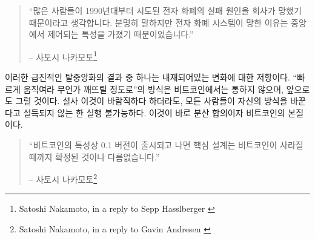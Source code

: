 \begin{quotation}\begin{samepage}
	\begin{comment}
		\enquote{A lot of people automatically dismiss e-currency as a lost cause
			because of all the companies that failed since the 1990's. I hope it's
			obvious it was only the centrally controlled nature of those systems
			that doomed them.}
		\begin{flushright} -- Satoshi Nakamoto\footnote{Satoshi Nakamoto, in a reply to Sepp Hasslberger \cite{satoshi-centralized-nature}}
		\end{comment}
		\enquote{많은 사람들이 1990년대부터 시도된 전자 화폐의 실패 원인을 회사가 망했기 때문이라고 생각합니다.
			분명히 말하지만 전자 화폐 시스템이 망한 이유는 중앙에서 제어되는 특성을 가졌기 때문이었습니다.}
		\begin{flushright} -- 사토시 나카모토\footnote{Satoshi Nakamoto, in a reply to Sepp Hasslberger \cite{satoshi-centralized-nature}}
\end{flushright}\end{samepage}\end{quotation}
	
\begin{comment}
	One consequence of this radical decentralization is an inherent
	resistance to change. \enquote{Move fast and break things} does not and will
	never work on the Bitcoin base layer. Even if it would be desirable, it
	wouldn't be possible without convincing \textit{everyone} to change their ways.
	That's distributed consensus. That's the nature of Bitcoin.
\end{comment}
이러한 급진적인 탈중앙화의 결과 중 하나는 내재되어있는 변화에 대한 저항이다.
\enquote{빠르게 움직여라 무언가 깨뜨릴 정도로}의 방식은 비트코인에서는 통하지 않으며, 앞으로도 그럴 것이다.
설사 이것이 바람직하다 하더라도, 모든 사람들이 자신의 방식을 바꾼다고 설득되지 않는 한 실행 불가능하다.
이것이 바로 분산 합의이자 비트코인의 본질이다.

\begin{quotation}\begin{samepage}
	\begin{comment}
		\enquote{The nature of Bitcoin is such that once version 0.1 was released, the
			core design was set in stone for the rest of its lifetime.}
		\begin{flushright} -- Satoshi Nakamoto\footnote{Satoshi Nakamoto, in a reply to Gavin Andresen \cite{satoshi-centralized-nature}}
		\end{comment}
		\enquote{비트코인의 특성상 0.1 버전이 출시되고 나면 핵심 설계는 비트코인이 사라질 때까지 확정된 것이나 다름없습니다.}
		\begin{flushright} -- 사토시 나카모토\footnote{Satoshi Nakamoto, in a reply to Gavin Andresen \cite{satoshi-centralized-nature}}
\end{flushright}\end{samepage}\end{quotation}

